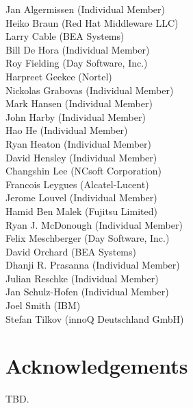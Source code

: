 Jan Algermissen (Individual Member) \\
Heiko Braun (Red Hat Middleware LLC) \\
Larry Cable (BEA Systems) \\
Bill De Hora (Individual Member) \\ 
Roy Fielding (Day Software, Inc.) \\
Harpreet Geekee (Nortel) \\
Nickolas Grabovas (Individual Member) \\
Mark Hansen (Individual Member) \\
John Harby (Individual Member) \\
Hao He (Individual Member) \\
Ryan Heaton (Individual Member) \\
David Hensley (Individual Member) \\
Changshin Lee (NCsoft Corporation) \\
Francois Leygues (Alcatel-Lucent) \\
Jerome Louvel (Individual Member) \\
Hamid Ben Malek (Fujitsu Limited) \\
Ryan J. McDonough (Individual Member) \\
Felix Meschberger (Day Software, Inc.) \\
David Orchard (BEA Systems) \\
Dhanji R. Prasanna (Individual Member) \\
Julian Reschke (Individual Member) \\
Jan Schulz-Hofen (Individual Member) \\
Joel Smith (IBM) \\
Stefan Tilkov (innoQ Deutschland GmbH)

\section{Acknowledgements}

\begin{ednote*}
TBD.
\end{ednote*}
